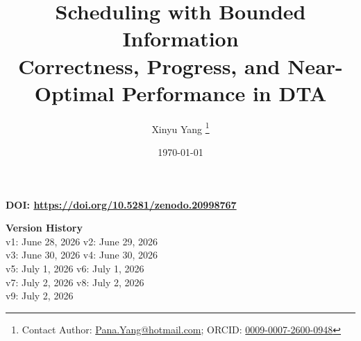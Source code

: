 \documentclass[11pt,a4paper]{article}
\title{\textbf{Scheduling with Bounded Information}\\[6pt]
\large Correctness, Progress, and Near-Optimal Performance in DTA}
\author{Xinyu Yang \orcidlink{0009-0007-2600-0948} \footnote{Contact Author: \href{mailto:Pana.Yang@hotmail.com}{Pana.Yang@hotmail.com}; ORCID: \href{https://orcid.org/0009-0007-2600-0948}{0009-0007-2600-0948}}}
\date{\today}
\begin{document}
\maketitle

\begin{center}
\textbf{DOI: \href{https://doi.org/10.5281/zenodo.20998767}{https://doi.org/10.5281/zenodo.20998767}} \\

\vspace{0.3em}

\textbf{Version History} \\
      \small v1: June 28, 2026 \quad v2: June 29, 2026 \\
      \small v3: June 30, 2026 \quad v4: June 30, 2026 \\
      \small v5: July 1, 2026 \quad v6: July 1, 2026 \\
      \small v7: July 2, 2026 \quad v8: July 2, 2026 \\
      \small v9: July 2, 2026
\end{center}

\vspace{0.6em}
\end{document}
